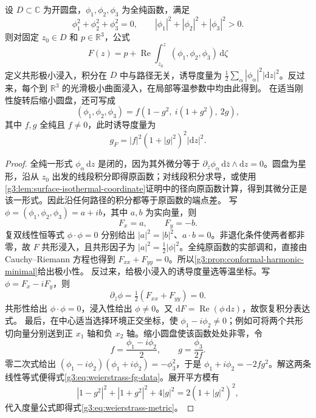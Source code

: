 \begin{theorem}[局部 Weierstrass 表示]\label{g3:thm:local-weierstrass-representation}
	设 \(D\subset\mathbb C\) 为开圆盘，\(\phi_1,\phi_2,\phi_3\) 为全纯函数，满足
	\begin{equation}\label{g3:eq:weierstrass-null-condition}
		\phi_1^2+\phi_2^2+\phi_3^2=0,\qquad
		|\phi_1|^2+|\phi_2|^2+|\phi_3|^2>0.
	\end{equation}
	则对固定 \(z_0\in D\) 和 \(p\in\mathbb R^3\)，公式
	\begin{equation}\label{g3:eq:weierstrass-null-integral}
		F(z)=p+\operatorname{Re}\int_{z_0}^z(\phi_1,\phi_2,\phi_3)\,\mathrm d\zeta
	\end{equation}
	定义共形极小浸入，积分在 \(D\) 中与路径无关，诱导度量为
	\(\frac12\sum_\alpha|\phi_\alpha|^2|\mathrm dz|^2\)。反过来，每个到 \(\mathbb R^3\) 的光滑极小曲面浸入，在局部等温参数中均由此得到。
	在适当刚性旋转后缩小圆盘，还可写成
	\begin{equation}\label{g3:eq:weierstrass-fg-data}
		(\phi_1,\phi_2,\phi_3)
		=f(1-g^2,\ i(1+g^2),\ 2g),
	\end{equation}
	其中 \(f,g\) 全纯且 \(f\ne0\)，此时诱导度量为
	\begin{equation}\label{g3:eq:weierstrass-metric}
		g_F=|f|^2(1+|g|^2)^2|\mathrm dz|^2.
	\end{equation}
\end{theorem}
\begin{proof}
	全纯一形式 \(\phi_\alpha\,\mathrm dz\) 是闭的，因为其外微分等于 \(\partial_{\bar z}\phi_\alpha\,\mathrm d\bar z\wedge\mathrm dz=0\)。圆盘为星形，沿从 \(z_0\) 出发的线段积分即得原函数；对线段积分求导，或使用\cref{g3:lem:surface-isothermal-coordinate}证明中的径向原函数计算，得到其微分正是该一形式。因此沿任何路径的积分都等于原函数的端点差。
	写 \(\phi=(\phi_1,\phi_2,\phi_3)=a+ib\)，其中 \(a,b\) 为实向量，则
	\[
		F_x=a,\qquad F_y=-b.
	\]
	复双线性恒等式 \(\phi\cdot\phi=0\) 分别给出
	\(|a|^2=|b|^2\)、\(a\cdot b=0\)。非退化条件使两者都非零，故 \(F\) 共形浸入，且共形因子为 \(|a|^2=\frac12|\phi|^2\)。全纯原函数的实部调和，直接由 Cauchy--Riemann 方程也得到 \(F_{xx}+F_{yy}=0\)。所以\cref{g3:prop:conformal-harmonic-minimal}给出极小性。
	反过来，给极小浸入的诱导度量选等温坐标。写
	\(\phi=F_x-iF_y\)，则
	\[
		\partial_{\bar z}\phi=\tfrac12(F_{xx}+F_{yy})=0.
	\]
	共形性给出 \(\phi\cdot\phi=0\)，浸入性给出 \(\phi\ne0\)。又 \(\mathrm dF=\operatorname{Re}(\phi\,\mathrm dz)\)，故恢复积分表达式。
	最后，在中心适当选择环境正交坐标，使 \(\phi_1-i\phi_2\ne0\)；例如可将两个共形切向量分别送到正 \(x_1\) 轴和负 \(x_2\) 轴。缩小圆盘使该函数处处非零，令
	\[
		f=\frac{\phi_1-i\phi_2}{2},\qquad
		g=\frac{\phi_3}{2f}.
	\]
	零二次式给出 \((\phi_1-i\phi_2)(\phi_1+i\phi_2)=-\phi_3^2\)，于是
	\(\phi_1+i\phi_2=-2fg^2\)。解这两条线性等式便得式\eqref{g3:eq:weierstrass-fg-data}。展开平方模有
	\[
		|1-g^2|^2+|1+g^2|^2+4|g|^2=2(1+|g|^2)^2,
	\]
	代入度量公式即得式\eqref{g3:eq:weierstrass-metric}。
\end{proof}

